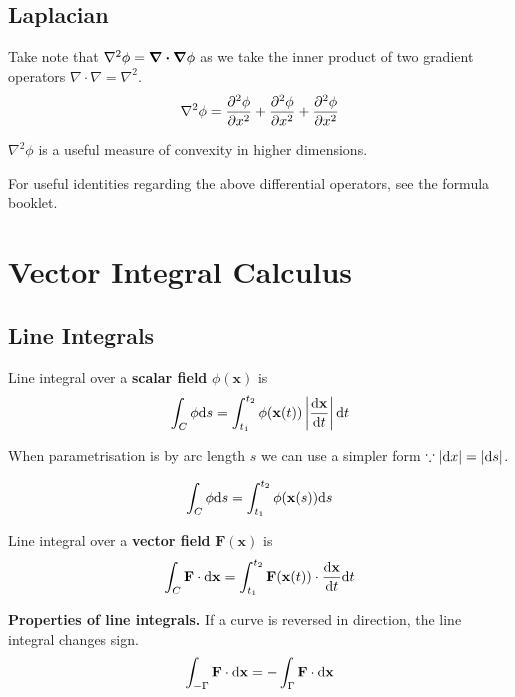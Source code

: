 \subsection*{Laplacian}
Take note that $\nabla^2 \phi = \divergence \grad \phi$ as we take the inner product of two gradient operators $\nabla \cdot \nabla = \nabla^2$.
\begin{equation*}
    \nabla^2 \phi =  \pdv[2]{\phi}{x} + \pdv[2]{\phi}{x} + \pdv[2]{\phi}{x}
\end{equation*}

$\nabla^2 \phi$ is a useful measure of convexity in higher dimensions.
\vspace{\baselineskip}

For useful identities regarding the above differential operators, see the formula booklet.

\section{Vector Integral Calculus}

\subsection*{Line Integrals}
Line integral over a \textbf{scalar field} $\phi(\mathbf{x})$ is
\begin{equation*}
    \int_C \phi \differential s = \int_{t_1}^{t_2} \phi(\mathbf{x}(t)) \left\lvert \dv{\mathbf{x}}{t} \right\rvert \differential t
\end{equation*}

When parametrisation is by arc length $s$ we can use a simpler form $\because |\differential x| = |\differential s|$.

\begin{equation*}
    \int_C \phi \differential s = \int_{t_1}^{t_2} \phi(\mathbf{x}(s)) \differential s
\end{equation*}

Line integral over a \textbf{vector field} $\mathbf{F}(\mathbf{x})$ is
\begin{equation*}
    \int_C \mathbf{F} \cdot \differential \mathbf{x} = \int_{t_1}^{t_2} \mathbf{F}(\mathbf{x}(t))\cdot \dv{\mathbf{x}}{t}\differential t
\end{equation*}

\textbf{Properties of line integrals.} If a curve is reversed in direction, the line integral changes sign.
\begin{equation*}
    \int_{- \Gamma} \mathbf{F} \cdot \differential \mathbf{x} = - \int_{\Gamma} \mathbf{F} \cdot \differential \mathbf{x}
\end{equation*}

